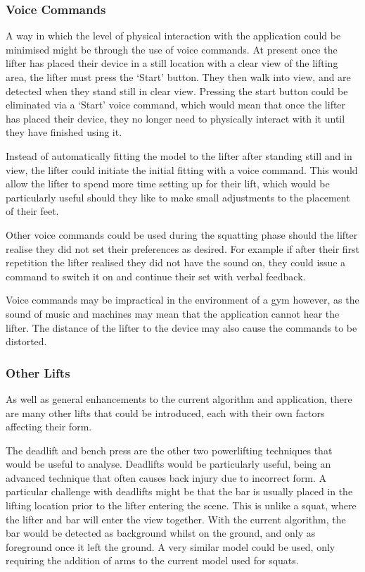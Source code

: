 \subsubsection{Voice Commands}

A way in which the level of physical interaction with the application could be minimised might be through the use of voice commands. At present once the lifter has placed their device in a still location with a clear view of the lifting area, the lifter must press the `Start' button. They then walk into view, and are detected when they stand still in clear view. Pressing the start button could be eliminated via a `Start' voice command, which would mean that once the lifter has placed their device, they no longer need to physically interact with it until they have finished using it.

Instead of automatically fitting the model to the lifter after standing still and in view, the lifter could initiate the initial fitting with a voice command. This would allow the lifter to spend more time setting up for their lift, which would be particularly useful should they like to make small adjustments to the placement of their feet.

Other voice commands could be used during the squatting phase should the lifter realise they did not set their preferences as desired. For example if after their first repetition the lifter realised they did not have the sound on, they could issue a command to switch it on and continue their set with verbal feedback.

Voice commands may be impractical in the environment of a gym however, as the sound of music and machines may mean that the application cannot hear the lifter. The distance of the lifter to the device may also cause the commands to be distorted.

\subsubsection{Other Lifts}

As well as general enhancements to the current algorithm and application, there are many other lifts that could be introduced, each with their own factors affecting their form.

The deadlift and bench press are the other two powerlifting techniques that would be useful to analyse. Deadlifts would be particularly useful, being an advanced technique that often causes back injury due to incorrect form. A particular challenge with deadlifts might be that the bar is usually placed in the lifting location prior to the lifter entering the scene. This is unlike a squat, where the lifter and bar will enter the view together. With the current algorithm, the bar would be detected as background whilst on the ground, and only as foreground once it left the ground. A very similar model could be used, only requiring the addition of arms to the current model used for squats.

